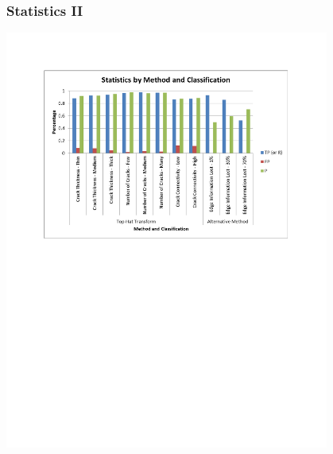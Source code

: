 \documentclass{beamer}
\begin{document}
\begin{frame}
\frametitle{Statistics II}
\begin{center}
\includegraphics[width=0.8\textwidth,trim={1in 5in 1in 1in},clip]{results_graph}
\end{center}
\end{frame}
\end{document}
